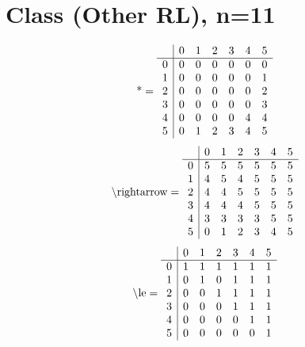 \documentclass[11pt]{article}
\begin{document}
\section{Class (Other RL), n=11}
\[\text{*} = 
\begin{array}{r | r r r r r r}
 & 0 & 1 & 2 & 3 & 4 & 5 \\ \hline
0 & 0 & 0 & 0 & 0 & 0 & 0 \\
1 & 0 & 0 & 0 & 0 & 0 & 1 \\
2 & 0 & 0 & 0 & 0 & 0 & 2 \\
3 & 0 & 0 & 0 & 0 & 0 & 3 \\
4 & 0 & 0 & 0 & 0 & 4 & 4 \\
5 & 0 & 1 & 2 & 3 & 4 & 5 \\
\end{array}
\]
\[\text{\textbackslash rightarrow} = 
\begin{array}{r | r r r r r r}
 & 0 & 1 & 2 & 3 & 4 & 5 \\ \hline
0 & 5 & 5 & 5 & 5 & 5 & 5 \\
1 & 4 & 5 & 4 & 5 & 5 & 5 \\
2 & 4 & 4 & 5 & 5 & 5 & 5 \\
3 & 4 & 4 & 4 & 5 & 5 & 5 \\
4 & 3 & 3 & 3 & 3 & 5 & 5 \\
5 & 0 & 1 & 2 & 3 & 4 & 5 \\
\end{array}
\]
\[\text{\textbackslash le} = 
\begin{array}{r | r r r r r r}
 & 0 & 1 & 2 & 3 & 4 & 5 \\ \hline
0 & 1 & 1 & 1 & 1 & 1 & 1 \\
1 & 0 & 1 & 0 & 1 & 1 & 1 \\
2 & 0 & 0 & 1 & 1 & 1 & 1 \\
3 & 0 & 0 & 0 & 1 & 1 & 1 \\
4 & 0 & 0 & 0 & 0 & 1 & 1 \\
5 & 0 & 0 & 0 & 0 & 0 & 1 \\
\end{array}
\]
\end{document}
